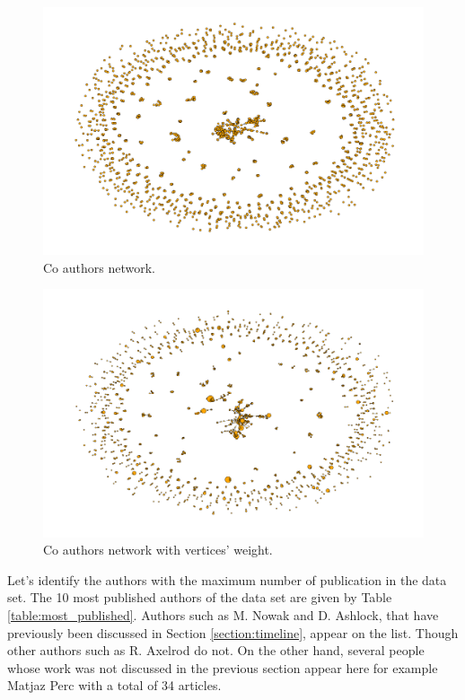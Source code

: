 \documentclass{article}
\begin{document}
\begin{figure}[!hbtp]
    \centering
    \includegraphics[width=\textwidth]{./assets/images/co-authors-network.pdf}
    \caption{Co authors network.}\label{fig:authors_network}
\end{figure}

\begin{figure}[!hbtp]
    \centering
    \includegraphics[width=\textwidth]{./assets/images/co-authors-network-weight.pdf}
    \caption{Co authors network with vertices' weight.}
    \label{fig:authors_network_weighted}
\end{figure}

Let's identify the authors with the maximum number of publication in the data set.
The 10 most published authors of the data set are given by Table
\ref{table:most_published}. Authors such as M. Nowak and D. Ashlock, that have
previously been discussed in Section \ref{section:timeline}, appear on the list.
Though other authors such as R. Axelrod do not. On the other hand, several people
whose work was not discussed in the previous section appear here for example 
Matjaz Perc with a total of 34 articles.
\end{document}
